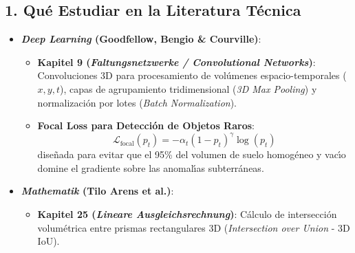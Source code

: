 \documentclass[11pt,a4paper]{article}
\begin{document}
\subsection{1. Qu{\'e} Estudiar en la Literatura T{\'e}cnica}
\begin{itemize}
    \item \textbf{\textit{Deep Learning} (Goodfellow, Bengio \& Courville)}:
    \begin{itemize}
        \item \textbf{Kapitel 9 (\textit{Faltungsnetzwerke / Convolutional Networks})}: Convoluciones 3D para procesamiento de vol{\'u}menes espacio-temporales ($x, y, t$), capas de agrupamiento tridimensional (\textit{3D Max Pooling}) y normalizaci{\'o}n por lotes (\textit{Batch Normalization}).
        \item \textbf{Focal Loss para Detecci{\'o}n de Objetos Raros}:
        \begin{equation}
            \mathcal{L}_{\text{focal}}(p_t) = -\alpha_t (1 - p_t)^\gamma \log(p_t)
        \end{equation}
        dise{\~n}ada para evitar que el 95\% del volumen de suelo homog{\'e}neo y vac{\'\i}o domine el gradiente sobre las anomal{\'\i}as subterr{\'a}neas.
    \end{itemize}
    \item \textbf{\textit{Mathematik} (Tilo Arens et al.)}:
    \begin{itemize}
        \item \textbf{Kapitel 25 (\textit{Lineare Ausgleichsrechnung})}: C{\'a}lculo de intersecci{\'o}n volum{\'e}trica entre prismas rectangulares 3D (\textit{Intersection over Union} - 3D IoU).
    \end{itemize}
\end{itemize}
\end{document}
